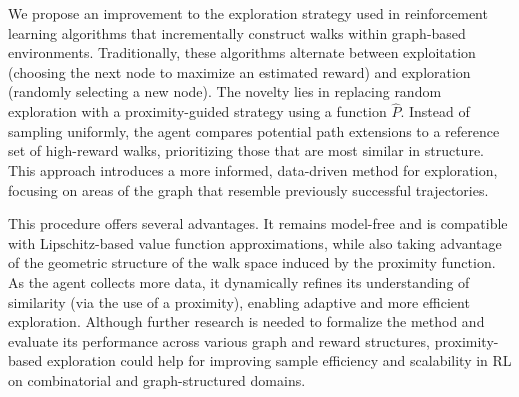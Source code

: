 \documentclass[preprint,12pt]{elsarticle}
\begin{document}
We propose an improvement to the exploration strategy used in reinforcement learning algorithms that incrementally construct walks within graph-based environments. Traditionally, these algorithms alternate between exploitation (choosing the next node to maximize an estimated reward) and exploration (randomly selecting a new node). The novelty lies in replacing random exploration with a proximity-guided strategy using a function $\widehat{P}$. Instead of sampling uniformly, the agent compares potential path extensions to a reference set of high-reward walks, prioritizing those that are most similar in structure. This approach introduces a more informed, data-driven method for exploration, focusing on areas of the graph that resemble previously successful trajectories.

This procedure offers several advantages. It remains model-free and is compatible with Lipschitz-based value function approximations, while also taking advantage of the geometric structure of the walk space induced by the proximity function. As the agent collects more data, it dynamically refines its understanding of similarity (via the use of a proximity), enabling adaptive and more efficient exploration. Although further research is needed to formalize the method and evaluate its performance across various graph and reward structures, proximity-based exploration could help for improving sample efficiency and scalability in RL on combinatorial and graph-structured domains.



\end{document}
